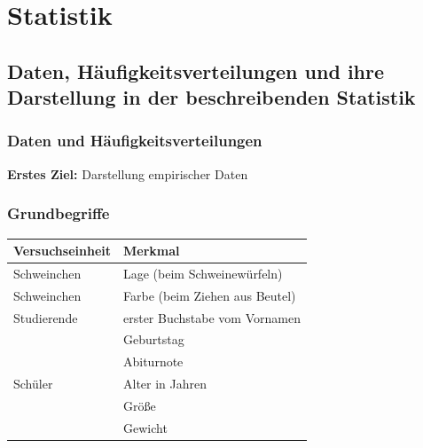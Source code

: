 
\chapter{Statistik}\label{ch:statistik}

\section{Daten, Häufigkeitsverteilungen und ihre Darstellung in der beschreibenden Statistik}\label{sec:daten-haufigkeitsverteilungen-und-ihre-darstellung-in-der-beschreibenden-statistik}

\subsection{Daten und Häufigkeitsverteilungen}\label{subsec:daten-und-haufigkeitsverteilungen}


\noindent \textbf{Erstes Ziel:} Darstellung empirischer Daten

\subsection*{Grundbegriffe}


\begin{bsp} 
   \begin{mytable}
       \begin{tabular}{ll}
           \hline
           \textbf{Versuchseinheit} & \textbf{Merkmal} \\
           \hline
           Schweinchen & Lage (beim Schweinewürfeln) \\
           Schweinchen & Farbe (beim Ziehen aus Beutel) \\
           Studierende & erster Buchstabe vom Vornamen \\
           & Geburtstag \\
           & Abiturnote \\
           Schüler     & Alter in Jahren \\
           & Größe \\
           & Gewicht \\
           \hline
       \end{tabular}
   \end{mytable}
\end{bsp}

